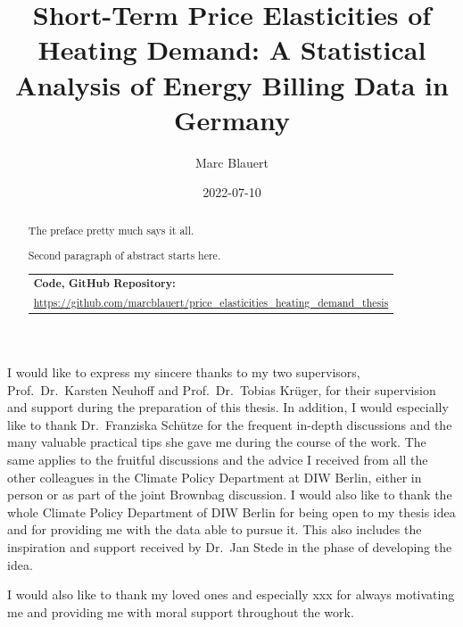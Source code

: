 \documentclass[12pt,twoside]{reedthesis}
\title{Short-Term Price Elasticities of Heating Demand: A Statistical Analysis of Energy Billing Data in Germany}
\author{Marc Blauert}
\date{2022-07-10}
\begin{document}
  \maketitle

\frontmatter %
\pagestyle{empty} %
  \begin{acknowledgements}
    I would like to express my sincere thanks to my two supervisors, Prof.~Dr.~Karsten Neuhoff and Prof.~Dr.~Tobias Krüger, for their supervision and support during the preparation of this thesis. In addition, I would especially like to thank Dr.~Franziska Schütze for the frequent in-depth discussions and the many valuable practical tips she gave me during the course of the work. The same applies to the fruitful discussions and the advice I received from all the other colleagues in the Climate Policy Department at DIW Berlin, either in person or as part of the joint Brownbag discussion. I would also like to thank the whole Climate Policy Department of DIW Berlin for being open to my thesis idea and for providing me with the data able to pursue it. This also includes the inspiration and support received by Dr.~Jan Stede in the phase of developing the idea.

    \par
    \bigskip

    I would also like to thank my loved ones and especially xxx for always motivating me and providing me with moral support throughout the work.
  \end{acknowledgements}

  \hypersetup{linkcolor=black}
  \setcounter{secnumdepth}{2}
  \setcounter{tocdepth}{2}
  \tableofcontents

  \listoftables

  \listoffigures
  \begin{abstract}
    The preface pretty much says it all.

    \par

    Second paragraph of abstract starts here.

    \bigskip \bigskip \noindent
    \begin{tabular}{m{14cm}} \hline \textbf{Code, GitHub Repository:} \\ \footnotesize \url{https://github.com/marcblauert/price_elasticities_heating_demand_thesis}  \\ \hline \end{tabular}
  \end{abstract}
\end{document}
